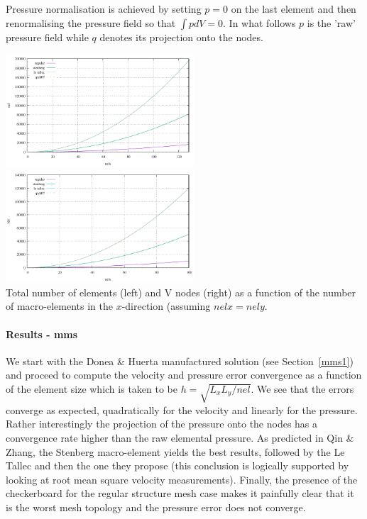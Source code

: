 Pressure normalisation is achieved by setting $p=0$ on the last element and then 
renormalising the pressure field so that $\int p dV=0$. In what follows $p$ is the 'raw' pressure
field while $q$ denotes its projection onto the nodes. 

\begin{center}
\includegraphics[width=7cm]{python_codes/fieldstone_78/images/nel}
\includegraphics[width=7cm]{python_codes/fieldstone_78/images/NV}\\
{\captionfont Total number of elements (left) and V nodes (right) as a function of the number
of macro-elements in the $x$-direction (assuming $nelx=nely$.}
\end{center}


\paragraph{Results - mms}

We start with the Donea \& Huerta manufactured solution (see Section~\ref{mms1}) and 
proceed to compute the velocity and pressure error convergence as a function of the 
element size which is taken to be $h = \sqrt{L_xL_y/nel}$. We see that 
the errors converge as expected, quadratically for the velocity and linearly for the pressure.
Rather interestingly the projection of the pressure onto the nodes has a convergence rate 
higher than the raw elemental pressure. As predicted in Qin \& Zhang, the Stenberg macro-element 
yields the best results, followed by the Le Tallec and then the one they propose (this conclusion 
is logically supported by looking at root mean square velocity measurements). 
Finally, the presence of the checkerboard for the regular structure mesh case
makes it painfully clear that it is the worst mesh topology 
and the pressure error does not converge.  

